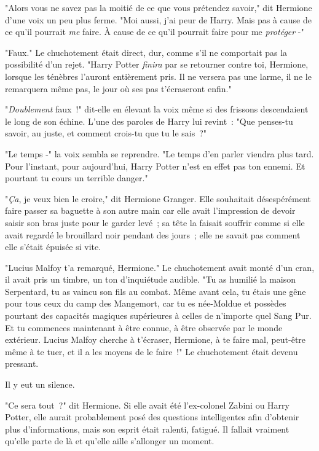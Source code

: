 "Alors vous ne savez pas la moitié de ce que vous prétendez savoir," dit Hermione d'une voix un peu plus ferme. "Moi aussi, j'ai peur de Harry. Mais pas à cause de ce qu'il pourrait \emph{me} faire. À cause de ce qu'il pourrait faire pour me \emph{protéger} -"

"Faux." Le chuchotement était direct, dur, comme s'il ne comportait pas la possibilité d'un rejet. "Harry Potter \emph{finira} par se retourner contre toi, Hermione, lorsque les ténèbres l'auront entièrement pris. Il ne versera pas une larme, il ne le remarquera même pas, le jour où ses pas t'écraseront enfin."

"\emph{Doublement} faux~!" dit-elle en élevant la voix même si des frissons descendaient le long de son échine. L'une des paroles de Harry lui revint~: "Que penses-tu savoir, au juste, et comment crois-tu que tu le sais~?"

"Le temps -" la voix sembla se reprendre. "Le temps d'en parler viendra plus tard. Pour l'instant, pour aujourd'hui, Harry Potter n'est en effet pas ton ennemi. Et pourtant tu cours un terrible danger."

"\emph{Ça}, je veux bien le croire," dit Hermione Granger. Elle souhaitait désespérément faire passer sa baguette à son autre main car elle avait l'impression de devoir saisir son bras juste pour le garder levé~; sa tête la faisait souffrir comme si elle avait regardé le brouillard noir pendant des jours~; elle ne savait pas comment elle s'était épuisée si vite.

"Lucius Malfoy t'a remarqué, Hermione." Le chuchotement avait monté d'un cran, il avait pris un timbre, un ton d'inquiétude audible. "Tu as humilié la maison Serpentard, tu as vaincu son fils au combat. Même avant cela, tu étais une gêne pour tous ceux du camp des Mangemort, car tu es née-Moldue et possèdes pourtant des capacités magiques supérieures à celles de n'importe quel Sang Pur. Et tu commences maintenant à être connue, à être observée par le monde extérieur. Lucius Malfoy cherche à t'écraser, Hermione, à te faire mal, peut-être même à te tuer, et il a les moyens de le faire~!" Le chuchotement était devenu pressant.

Il y eut un silence.

"Ce sera tout~?" dit Hermione. Si elle avait été l'ex-colonel Zabini ou Harry Potter, elle aurait probablement posé des questions intelligentes afin d'obtenir plus d'informations, mais son esprit était ralenti, fatigué. Il fallait vraiment qu'elle parte de là et qu'elle aille s'allonger un moment.

